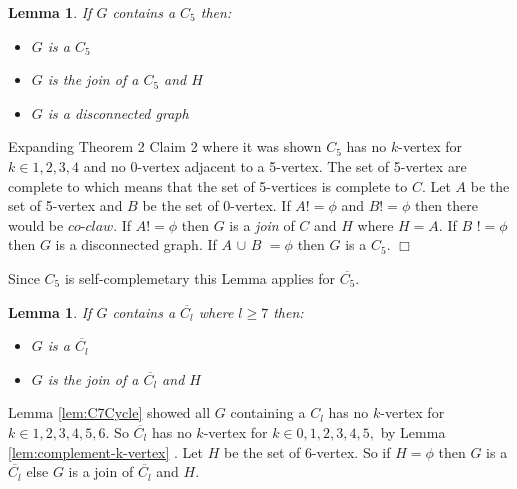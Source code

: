 \documentclass[12pt]{article}
\newtheorem{Lemma}[Theorem]{Lemma}
\begin{document}
\medskip

\begin{Lemma}\label{lem:c5join}
If $G$ contains a $C_5$ then:
\begin{itemize}
\item[(i)]
$G$ is a $C_5$
\item[(i)]
$G$ is the join of a $C_5$ and $H$
\item[(i)]
$G$ is a disconnected graph
\end{itemize}
\end{Lemma}
 Expanding \cite{BraFud2002} Theorem 2 Claim 2 where it was shown $C_5$ has no $k$-vertex for $k \in {1,2,3,4}$ and no 0-vertex adjacent to a 5-vertex. The set of 5-vertex are complete to
 which means that the set of 5-vertices is complete to $C$. Let $A$ be the set of 5-vertex and $B$ be the set of 0-vertex. If $A != \phi$ and $B != \phi$ then there would be $co$-$claw$. If $A != \phi$ then $G$ is a {\it join} of $C$ and $H$ where $H = A$. If $B$ $!= \phi$ then  $G$ is a disconnected graph. If $A$ $\cup$ $B$ $= \phi$ then $G$ is a $C_5$.  $\Box$

Since $C_5$ is self-complemetary this Lemma applies for $\overline{C_5}$.
\medskip

\begin{Lemma}\label{lem:co-cl}
If $G$ contains a $\overline{C_l}$ where $l \geq 7$ then:
\begin{itemize}
\item[(i)]
$G$ is a $\overline{C_l}$
\item[(i)]
$G$ is the join of a $\overline{C_l}$ and $H$
\end{itemize}
\end{Lemma}
 Lemma \ref{lem:C7Cycle} showed all $G$ containing a $C_l$ has no $k$-vertex for $k \in {1, 2, 3, 4, 5, 6}$. So $\overline{C_l}$ has no $k$-vertex for $k \in {0, 1, 2, 3, 4, 5,}$ by Lemma \ref{lem:complement-k-vertex} . Let $H$ be the set of 6-vertex. So if $H = \phi$ then $G$ is a $\overline{C_l}$ else $G$ is a join of $\overline{C_l}$ and $H$.
\end{document}
